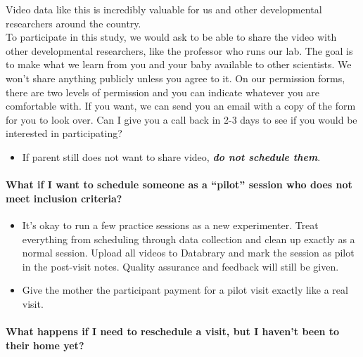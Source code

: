 \documentclass[
]{book}
\providecommand{\tightlist}{%
  \setlength{\itemsep}{0pt}\setlength{\parskip}{0pt}}
\begin{document}
Video data like this is incredibly valuable for us and other developmental researchers around the country.\\
To participate in this study, we would ask to be able to share the video with other developmental researchers, like the professor who runs our lab. The goal is to make what we learn from you and your baby available to other scientists. We won't share anything publicly unless you agree to it. On our permission forms, there are two levels of permission and you can indicate whatever you are comfortable with. If you want, we can send you an email with a copy of the form for you to look over. Can I give you a call back in 2-3 days to see if you would be interested in participating?

\begin{itemize}
\tightlist
\item
  If parent still does not want to share video, \emph{\textbf{do not schedule them}}.
\end{itemize}

\hypertarget{what-if-i-want-to-schedule-someone-as-a-pilot-session-who-does-not-meet-inclusion-criteria}{%
\paragraph*{What if I want to schedule someone as a ``pilot'' session who does not meet inclusion criteria?}\label{what-if-i-want-to-schedule-someone-as-a-pilot-session-who-does-not-meet-inclusion-criteria}}

\begin{itemize}
\tightlist
\item
  It's okay to run a few practice sessions as a new experimenter. Treat everything from scheduling through data collection and clean up exactly as a normal session. Upload all videos to Databrary and mark the session as pilot in the post-visit notes. Quality assurance and feedback will still be given.
\item
  Give the mother the participant payment for a pilot visit exactly like a real visit.
\end{itemize}

\hypertarget{what-happens-if-i-need-to-reschedule-a-visit-but-i-havent-been-to-their-home-yet}{%
\paragraph*{What happens if I need to reschedule a visit, but I haven't been to their home yet?}\label{what-happens-if-i-need-to-reschedule-a-visit-but-i-havent-been-to-their-home-yet}}
\end{document}
